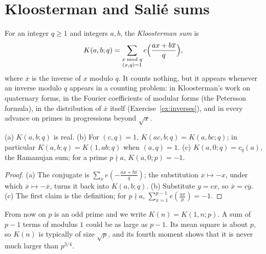 \section{Kloosterman and Salié sums}

For an integer $q\ge1$ and integers $a,b$, the \emph{Kloosterman sum} is
\[
K(a,b;q)=\sum_{\substack{x\bmod q\\(x,q)=1}}e\Bigl(\frac{ax+b\overline x}q\Bigr),
\]
where $\overline x$ is the inverse of $x$ modulo $q$. It counts nothing, but it appears whenever an inverse modulo $q$ appears in a counting problem: in Kloosterman's work on quaternary forms, in the Fourier coefficients of modular forms (the Petersson formula), in the distribution of $\overline x$ itself (Exercise~\ref{ex:inverses}), and in every advance on primes in progressions beyond $\sqrt x$.

\begin{proposition}\label{prop:klbasic}
(a) $K(a,b;q)$ is real. (b) For $(c,q)=1$, $K(ac,b;q)=K(a,bc;q)$; in particular $K(a,b;q)=K(1,ab;q)$ when $(a,q)=1$. (c) $K(a,0;q)=c_q(a)$, the Ramanujan sum; for a prime $p\nmid a$, $K(a,0;p)=-1$.
\end{proposition}
\begin{proof}
(a) The conjugate is $\sum_xe(-\frac{ax+b\overline x}q)$; the substitution $x\mapsto-x$, under which $\overline x\mapsto-\overline x$, turns it back into $K(a,b;q)$. (b) Substitute $y=cx$, so $\overline x=c\overline y$. (c) The first claim is the definition; for $p\nmid a$, $\sum_{x=1}^{p-1}e(\frac{ax}p)=-1$.
\end{proof}

From now on $p$ is an odd prime and we write $K(n)=K(1,n;p)$. A sum of $p-1$ terms of modulus $1$ could be as large as $p-1$. Its mean square is about $p$, so $K(n)$ is typically of size $\sqrt p$, and its fourth moment shows that it is never much larger than $p^{3/4}$.

